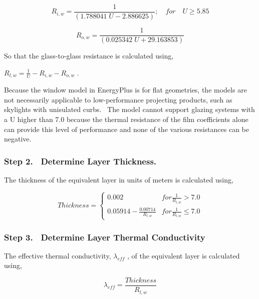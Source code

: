 \begin{equation}
{R_{i,w}} = \frac{1}{{(1.788041\;U - 2.886625)}};\quad for\quad U \ge 5.85
\end{equation}

\begin{equation}
{R_{o,w}} = \frac{1}{{(0.025342\;U + 29.163853)}}
\end{equation}

So that the glass-to-glass resistance is calculated using,

\({R_{l,w}} = \frac{1}{U} - {R_{i,w}} - {R_{o,w}}\) .

Because the window model in EnergyPlus is for flat geometries, the models are not necessarily applicable to low-performance projecting products, such as skylights with unisulated curbs.~ The model cannot support glazing systems with a U higher than 7.0 because the thermal resistance of the film coefficients alone can provide this level of performance and none of the various resistances can be negative.

\subsubsection{Step 2.~ Determine Layer Thickness.}\label{step-2.-determine-layer-thickness.}

The thickness of the equivalent layer in units of meters is calculated using,

\begin{equation}
  Thickness = \left\{
                \begin{array}{cl}
                  0.002                             & for \frac{1}{R_{l,w}} > 7.0 \\
                  0.05914 - \frac{0.00714}{R_{l,w}} & for \frac{1}{R_{l,w}} \leq 7.0
                \end{array}
              \right.
\end{equation}

\subsubsection{Step 3.~ Determine Layer Thermal Conductivity}\label{step-3.-determine-layer-thermal-conductivity}

The effective thermal conductivity, \({\lambda_{eff}}\) , of the equivalent layer is calculated using,

\begin{equation}
{\lambda_{eff}} = \frac{{Thickness}}{{{R_{l,w}}}}
\end{equation}

